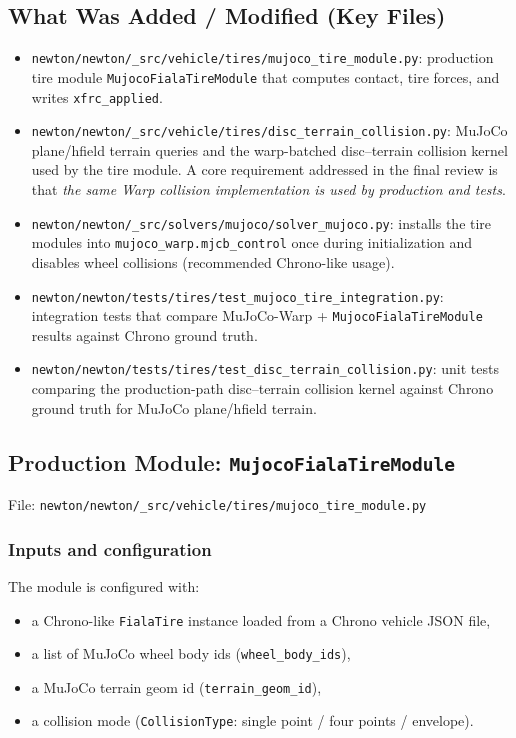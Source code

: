 \subsection{What Was Added / Modified (Key Files)}
\begin{itemize}
  \item \texttt{newton/newton/\_src/vehicle/tires/mujoco\_tire\_module.py}:
    production tire module \texttt{MujocoFialaTireModule} that computes contact, tire forces, and writes \texttt{xfrc\_applied}.

  \item \texttt{newton/newton/\_src/vehicle/tires/disc\_terrain\_collision.py}:
    MuJoCo plane/hfield terrain queries and the warp-batched disc--terrain collision kernel used by the tire module.
    A core requirement addressed in the final review is that \emph{the same Warp collision implementation is used by production and tests}.

  \item \texttt{newton/newton/\_src/solvers/mujoco/solver\_mujoco.py}:
    installs the tire modules into \texttt{mujoco\_warp.mjcb\_control} once during initialization and
    disables wheel collisions (recommended Chrono-like usage).

  \item \texttt{newton/newton/tests/tires/test\_mujoco\_tire\_integration.py}:
    integration tests that compare MuJoCo-Warp + \texttt{MujocoFialaTireModule} results against Chrono ground truth.

  \item \texttt{newton/newton/tests/tires/test\_disc\_terrain\_collision.py}:
    unit tests comparing the production-path disc--terrain collision kernel against Chrono ground truth for MuJoCo plane/hfield terrain.
\end{itemize}

\subsection{Production Module: \texttt{MujocoFialaTireModule}}
\label{sec:substep4-mujoco-tire-module}
File: \texttt{newton/newton/\_src/vehicle/tires/mujoco\_tire\_module.py}

\subsubsection{Inputs and configuration}
The module is configured with:
\begin{itemize}
  \item a Chrono-like \texttt{FialaTire} instance loaded from a Chrono vehicle JSON file,
  \item a list of MuJoCo wheel body ids (\texttt{wheel\_body\_ids}),
  \item a MuJoCo terrain geom id (\texttt{terrain\_geom\_id}),
  \item a collision mode (\texttt{CollisionType}: single point / four points / envelope).
\end{itemize}

